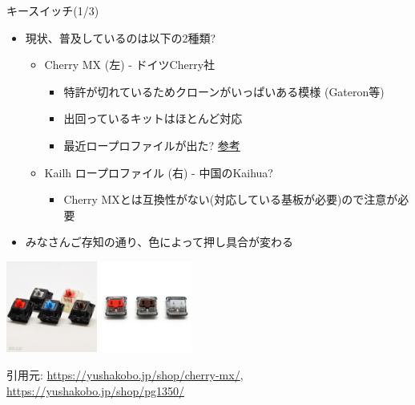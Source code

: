 \documentclass[cjk,dvipdfmx,10pt,compress,fragile%
hyperref={bookmarks=true,bookmarksnumbered=true,bookmarksopen=false,%
colorlinks=false,%
pdftitle={第 134 回 関西 Debian 勉強会},%
pdfauthor={小林},%
pdfsubject={資料},%
}]{beamer}
\begin{document}
\begin{frame}[fragile,t]{キースイッチ(1/3)}
 \begin{itemize}
  \item 現状、普及しているのは以下の2種類?
	\begin{itemize}
	 \item Cherry MX (左)  - ドイツCherry社
	       \begin{itemize}
		\item 特許が切れているためクローンがいっぱいある模様 (Gateron等)
		\item 出回っているキットはほとんど対応
		\item 最近ロープロファイルが出た? \href{https://www.cherrymx.de/en/mx-low-profile/mx-low-profile-red.html}{参考}
	       \end{itemize}
	 \item Kailh ロープロファイル (右) - 中国のKaihua?
	       \begin{itemize}
		\item Cherry MXとは互換性がない(対応している基板が必要)ので注意が必要
	       \end{itemize}
	\end{itemize}
  \item みなさんご存知の通り、色によって押し具合が変わる
 \end{itemize}
 \begin{center}
  \includegraphics[keepaspectratio,height=3cm]{./img/Cherry_MX-1.jpg}
  \hspace*{1zw}
  \includegraphics[keepaspectratio,height=3cm]{./img/YKB0003S.jpg}
 \end{center}
 \vspace{-1zw}
 \begin{flushright}
  \footnotesize
  引用元: \url{https://yushakobo.jp/shop/cherry-mx/}, \url{https://yushakobo.jp/shop/pg1350/}
 \end{flushright}
\end{frame}
\end{document}
